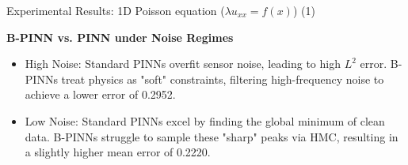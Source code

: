 \documentclass[10pt, aspectratio=169]{beamer}
\begin{document}
\begin{frame}{Experimental Results: 1D Poisson equation ($\lambda u_{xx} = f(x)$) (1)}

  
\begin{table}[h]
\centering
{}
\caption{\tiny Metrics for the 1D poisson equation forward problem with measurement noise 0.1}
\label{tab:5x5}
\end{table}



\begin{table}[h]
\centering
{}
\caption{ \tiny Metrics for the 1D poisson equation forward problem with measurement noise 0.01}
\label{tab:5x5}
\end{table}

\textbf{B-PINN vs. PINN under Noise Regimes}
\begin{itemize}
    \item High Noise: Standard PINNs overfit sensor noise, leading to high $L^2$ error. B-PINNs treat physics as "soft" constraints, filtering high-frequency noise to achieve a lower error of 0.2952.
    \item Low Noise: Standard PINNs excel by finding the global minimum of clean data. B-PINNs struggle to sample these "sharp" peaks via HMC, resulting in a slightly higher mean error of 0.2220.
\end{itemize}
\end{frame}
\end{document}
